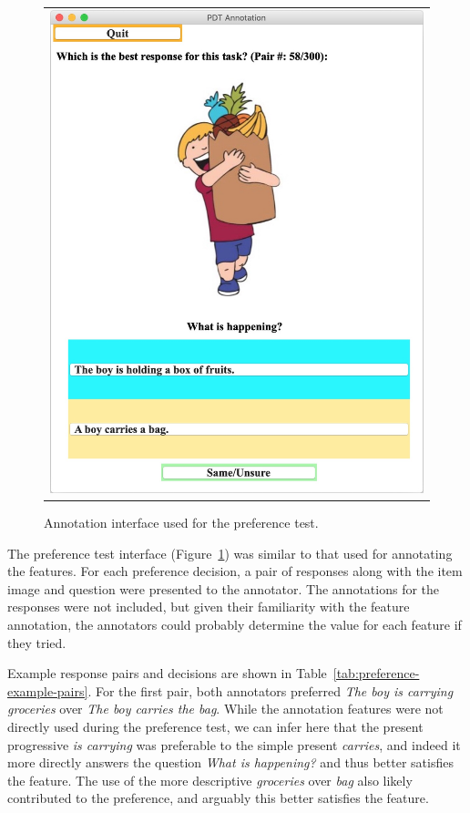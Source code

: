 \begin{figure}[htb!]
\begin{center}
\begin{tabular}{c}
\includegraphics[width=0.85\columnwidth]{figures/ab_interface.jpg} \\
\end{tabular}
\caption{\label{fig:preference-interface} Annotation interface used for the preference test.}
\end{center}
\end{figure}

The preference test interface (Figure~\ref{fig:preference-interface}) was similar to that used for annotating the features. For each preference decision, a pair of responses along with the item image and question were presented to the annotator. The annotations for the responses were not included, but given their familiarity with the feature annotation, the annotators could probably determine the value for each feature if they tried.

Example response pairs and decisions are shown in Table~\ref{tab:preference-example-pairs}. For the first pair, both annotators preferred \textit{The boy is carrying groceries} over \textit{The boy carries the bag}. While the annotation features were not directly used during the preference test, we can infer here that the present progressive \textit{is carrying} was preferable to the simple present \textit{carries}, and indeed it more directly answers the question \textit{What is happening?} and thus better satisfies the  feature. The use of the more descriptive \textit{groceries} over \textit{bag} also likely contributed to the preference, and arguably this better satisfies the  feature.

